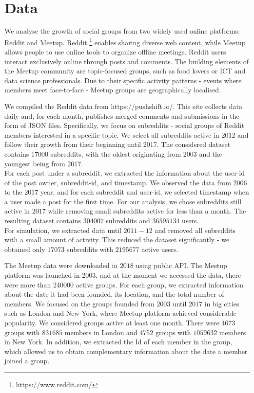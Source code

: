 \section{Data}
We analyse the growth of social groups from two widely used online platforms: Reddit and Meetup. Reddit \footnote{https://www.reddit.com/} enables sharing diverse web content, while Meetup \cite{www.meetup.com} allows people to use online tools to organize offline meetings. Reddit users interact exclusively online through posts and comments. The building elements of the Meetup community are topic-focused groups, such as food lovers or ICT and data science professionals. Due to their specific activity patterns - events where members meet face-to-face - Meetup groups are geographically localised. 

We compiled the Reddit data from https://pushshift.io/. This site collects data daily and, for each month, publishes merged comments and submissions in the form of JSON files. 
Specifically, we focus on subreddits - social groups of Reddit members interested in a specific topic. We select all subreddits active in 2012 and follow their growth from their beginning until 2017. The considered dataset contains 17000 subreddits, with the oldest originating from 2003 and the youngest being from 2017.\\
For each post under a subreddit, we extracted the information about the user-id of the post owner, subreddit-id, and timestamp. We observed the data from $2006$ to the $2017$ year, and for each subreddit and user-id, we selected timestamp when a user made a post for the first time. For our analysis, we chose subreddits still active in $2017$ while removing small subreddits active for less than a month. The resulting dataset contains $304 007$ subreddits and  $36 595 134$ users. \\
For simulation, we extracted data until $2011-12$ and removed all subreddits with a small amount of activity. This reduced the dataset significantly - we obtained only $17 073$ subreddits with $2 195 677$ active users. 

The Meetup data were downloaded in $2018$ using public API. The Meetup platform was launched in 2003, and at the moment we accessed the data, there were more than 240000 active groups. For each group, we extracted information about the date it had been founded, its location, and the total number of members. We focused on the groups founded from $2003$ until $2017$ in big cities such as London and New York, where Meetup platform achieved considerable popularity. We considered groups active at least one month. There were 4673 groups with $831685$ members in London and 4752 groups with $1059632$ members in New York. In addition, we extracted the Id of each member in the group, which allowed us to obtain complementary information about the date a member joined a group. 

